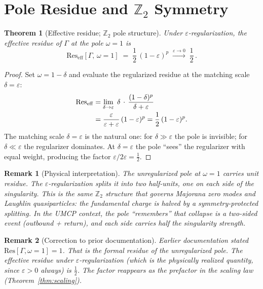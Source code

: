\documentclass[
  aps,
  prd,
  twocolumn,
  showpacs,
  superscriptaddress,
  nofootinbib,
  floatfix
]{revtex4-2}
\newtheorem{theorem}{Theorem}
\newtheorem{remark}{Remark}
\newcommand{\Gam}{\Gamma}
\newcommand{\eps}{\varepsilon}
\newcommand{\Res}{\mathrm{Res}}
\newcommand{\beq}{\begin{equation}}
\newcommand{\eeq}{\end{equation}}
\begin{document}
\section{Pole Residue and \texorpdfstring{$\mathbb{Z}_2$}{Z2}
  Symmetry}\label{sec:pole}

\begin{theorem}[Effective residue; $\mathbb{Z}_2$ pole
  structure]\label{thm:residue}
Under $\eps$-regularization, the effective residue of\/ $\Gam$ at
the pole $\omega=1$ is
\beq\label{eq:residue}
  \Res_{\mathrm{eff}}[\Gam,\,\omega{=}1]
  \;=\; \frac{1}{2}\,(1-\eps)^{p}
  \;\xrightarrow{\eps\to0}\;
  \frac{1}{2}\,.
\eeq
\end{theorem}

\begin{proof}
Set $\omega = 1-\delta$ and evaluate the regularized residue
at the matching scale $\delta=\eps$:
\begin{align}
  \Res_{\mathrm{eff}}
    &= \lim_{\delta\to\eps}\;\delta\,\cdot\,
       \frac{(1-\delta)^p}{\delta+\eps} \notag\\
    &= \frac{\eps}{\eps+\eps}\,(1-\eps)^p
     = \frac{1}{2}\,(1-\eps)^p.\label{eq:residue_proof}
\end{align}
The matching scale $\delta=\eps$ is the natural one: for
$\delta\gg\eps$ the pole is invisible; for
$\delta\ll\eps$ the regularizer dominates.
At $\delta=\eps$ the pole ``sees'' the regularizer
with equal weight, producing the factor $\eps/2\eps =
\tfrac{1}{2}$.
\end{proof}

\begin{remark}[Physical interpretation]
The unregularized pole at $\omega=1$ carries unit residue.
The $\eps$-regularization splits it into two half-units, one
on each side of the singularity. This is the same $\mathbb{Z}_2$
structure that governs Majorana zero modes and Laughlin
quasiparticles: the fundamental charge is halved by a
symmetry-protected splitting.  In the UMCP context, the pole
``remembers'' that collapse is a two-sided event (outbound +
return), and each side carries half the singularity strength.
\end{remark}

\begin{remark}[Correction to prior documentation]
Earlier documentation stated $\Res[\Gam,\omega{=}1]=1$.
That is the \emph{formal} residue of the unregularized pole.
The \emph{effective} residue under $\eps$-regularization
(which is the physically realized quantity, since $\eps>0$
always) is $\tfrac{1}{2}$.  The factor reappears as the
prefactor in the scaling law (Theorem~\ref{thm:scaling}).
\end{remark}
\end{document}
